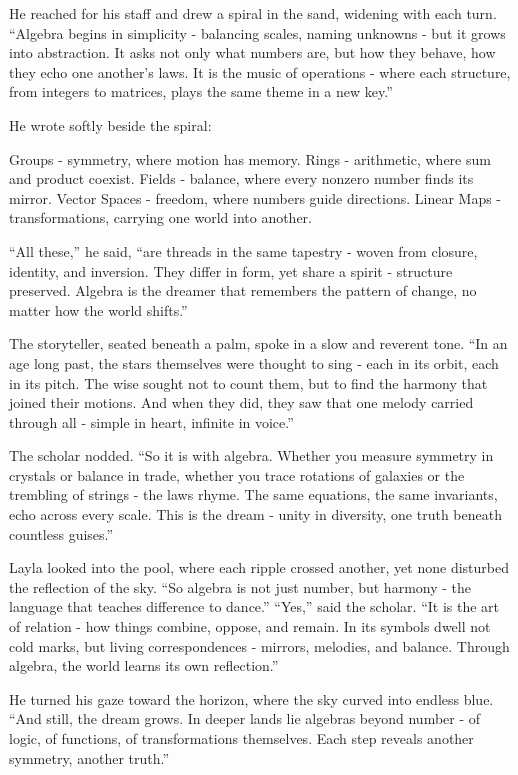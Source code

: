 \documentclass[
  letterpaper,
  DIV=11,
  numbers=noendperiod]{scrreprt}
\begin{document}
He reached for his staff and drew a spiral in the sand, widening with
each turn. ``Algebra begins in simplicity - balancing scales, naming
unknowns - but it grows into abstraction. It asks not only what numbers
are, but how they behave, how they echo one another's laws. It is the
music of operations - where each structure, from integers to matrices,
plays the same theme in a new key.''

He wrote softly beside the spiral:

Groups - symmetry, where motion has memory. Rings - arithmetic, where
sum and product coexist. Fields - balance, where every nonzero number
finds its mirror. Vector Spaces - freedom, where numbers guide
directions. Linear Maps - transformations, carrying one world into
another.

``All these,'' he said, ``are threads in the same tapestry - woven from
closure, identity, and inversion. They differ in form, yet share a
spirit - structure preserved. Algebra is the dreamer that remembers the
pattern of change, no matter how the world shifts.''

The storyteller, seated beneath a palm, spoke in a slow and reverent
tone. ``In an age long past, the stars themselves were thought to sing -
each in its orbit, each in its pitch. The wise sought not to count them,
but to find the harmony that joined their motions. And when they did,
they saw that one melody carried through all - simple in heart, infinite
in voice.''

The scholar nodded. ``So it is with algebra. Whether you measure
symmetry in crystals or balance in trade, whether you trace rotations of
galaxies or the trembling of strings - the laws rhyme. The same
equations, the same invariants, echo across every scale. This is the
dream - unity in diversity, one truth beneath countless guises.''

Layla looked into the pool, where each ripple crossed another, yet none
disturbed the reflection of the sky. ``So algebra is not just number,
but harmony - the language that teaches difference to dance.'' ``Yes,''
said the scholar. ``It is the art of relation - how things combine,
oppose, and remain. In its symbols dwell not cold marks, but living
correspondences - mirrors, melodies, and balance. Through algebra, the
world learns its own reflection.''

He turned his gaze toward the horizon, where the sky curved into endless
blue. ``And still, the dream grows. In deeper lands lie algebras beyond
number - of logic, of functions, of transformations themselves. Each
step reveals another symmetry, another truth.''
\end{document}
